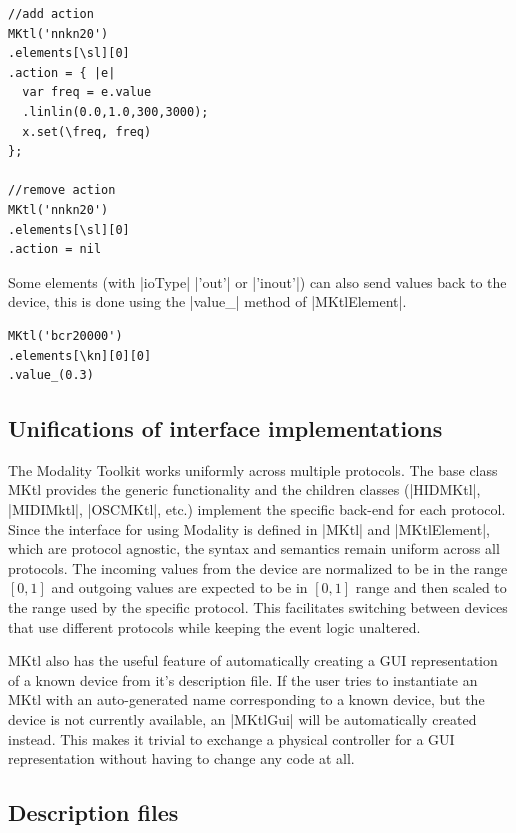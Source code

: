 \documentclass{article}
\begin{document}
\begin{Verbatim}
//add action
MKtl('nnkn20')
.elements[\sl][0]
.action = { |e|
  var freq = e.value
  .linlin(0.0,1.0,300,3000);
  x.set(\freq, freq)
};

//remove action
MKtl('nnkn20')
.elements[\sl][0]
.action = nil
\end{Verbatim}

Some elements (with |ioType| |'out'| or |'inout'|) can also send values back to the device, this is done using the |value_| method of |MKtlElement|.

\begin{Verbatim}	
MKtl('bcr20000')
.elements[\kn][0][0]
.value_(0.3)
\end{Verbatim}

\subsection{Unifications of interface implementations}
\label{sub:unifications_of_interface_implementations}

The Modality Toolkit works uniformly across multiple protocols. The base class MKtl provides the generic functionality and the children classes (|HIDMKtl|, |MIDIMktl|, |OSCMKtl|, etc.) implement the specific back-end for each protocol. Since the interface for using Modality is defined in |MKtl| and |MKtlElement|, which are protocol agnostic, the syntax and semantics remain uniform across all protocols. The incoming values from the device are normalized to be in the range $[0,1]$ and outgoing values are expected to be in $[0,1]$ range and then scaled to the range used by the specific protocol. This facilitates switching between devices that use different protocols while keeping the event logic unaltered.

MKtl also has the useful feature of automatically creating a GUI representation of a known device from it's description file. If the user tries to instantiate an MKtl with an auto-generated name corresponding to a known device, but the device is not currently available, an |MKtlGui| will be automatically created instead. This makes it trivial to exchange a physical controller for a GUI representation without having to change any code at all.

\subsection{Description files}
\label{sub:descriptions_files}
\end{document}
